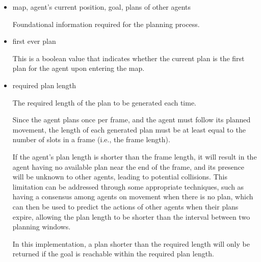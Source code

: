 \begin{itemize}
    \item map, agent's current position, goal, plans of other agents

    Foundational information required for the planning process.

    \item first ever plan
    
    This is a boolean value that indicates whether the current plan is the first plan for the agent upon entering the map.



    \item required plan length
    
    The required length of the plan to be generated each time.

    Since the agent plans once per frame, and the agent must follow its planned movement, the length of each generated plan must be at least equal to the number of slots in a frame (i.e., the frame length).

    If the agent's plan length is shorter than the frame length, it will result in the agent having no available plan near the end of the frame, and its presence will be unknown to other agents, leading to potential collisions.
    This limitation can be addressed through some appropriate techniques, such as having a consensus among agents on movement when there is no plan, which can then be used to predict the actions of other agents when their plans expire, allowing the plan length to be shorter than the interval between two planning windows.
    
    In this implementation, a plan shorter than the required length will only be returned if the goal is reachable within the required plan length.
    

\end{itemize}
